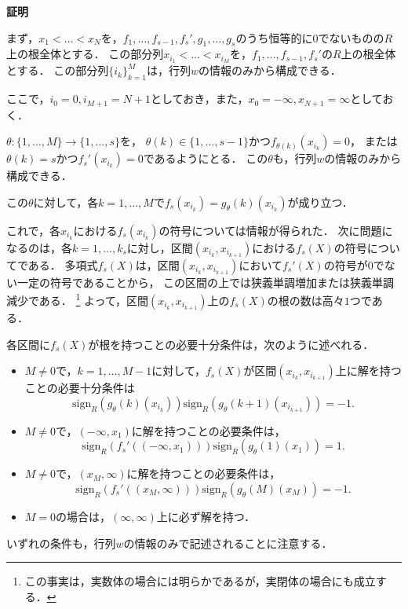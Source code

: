 \documentclass[uplatex, dvipdfmx]{jsarticle}
\makeatletter
\renewenvironment{proof}[1][\proofname]{\par
  \pushQED{\qed}%
  \normalfont \topsep6\p@\@plus6\p@\relax
  \trivlist
  \item\relax
  {\bfseries
  #1\@addpunct{.}}\hspace\labelsep\ignorespaces
}{%
  \popQED\endtrivlist\@endpefalse
}
\newcommand{\sign}{\mathrm{sign}}
\newcommand{\map}[3]{{#1}:{#2}\rightarrow{#3}}
\theoremstyle{definition}
\renewcommand{\proofname}{\textbf{証明}}
\makeatother
\begin{document}
\begin{proof}
     まず，$x_1 < \dots < x_N$を，$f_1, \dots, f_{s-1}, f_s', g_1, \dots, g_s$のうち恒等的に$0$でないものの$R$上の根全体とする．
     この部分列$x_{i_1} < \dots < x_{i_M}$を，$f_1, \dots, f_{s-1}, f_s'$の$R$上の根全体とする．
     この部分列$\{i_k\}_{k=1}^M$は，行列$w$の情報のみから構成できる．

     ここで，$i_0 = 0, i_{M+1} = N+1$としておき，また，$x_0= -\infty, x_{N+1} = \infty$としておく．

     $\map{\theta}{\{1, \dots, M\}}{\{1, \dots, s\}}$を，
     $\theta(k) \in \{1, \dots, s-1\}$かつ$f_{\theta(k)}(x_{i_k}) = 0$，
     または$\theta(k)=s$かつ$f_{s}'(x_{i_k})=0$であるようにとる．
     この$\theta$も，行列$w$の情報のみから構成できる．

     この$\theta$に対して，各$k=1, \dots, M$で$f_s(x_{i_k}) = g_\theta(k)(x_{i_k})$が成り立つ．

     これで，各$x_{i_k}$における$f_s(x_{i_k})$の符号については情報が得られた．
     次に問題になるのは，各$k=1,\dots, k_s$に対し，区間$(x_{i_k},x_{i_{k+1}})$における$f_s(X)$の符号についてである．
     多項式$f_s(X)$は，区間$(x_{i_k},x_{i_{k+1}})$において$f_s'(X)$の符号が$0$でない一定の符号であることから，
     この区間の上では狭義単調増加または狭義単調減少である．
     \footnote{この事実は，実数体の場合には明らかであるが，実閉体の場合にも成立する．}
     よって，区間$(x_{i_k},x_{i_{k+1}})$上の$f_s(X)$の根の数は高々$1$つである．

     各区間に$f_s(X)$が根を持つことの必要十分条件は，次のように述べれる．
     \begin{itemize}
          \item $M\neq0$で，$k=1, \dots, M-1$に対して，$f_s(X)$が区間$(x_{i_k}, x_{i_{k+1}})$上に解を持つことの必要十分条件は
          \[
               \sign_R(g_\theta(k)(x_{i_k}))\sign_R(g_\theta(k+1)(x_{i_{k+1}})) = -1.
          \]
          \item $M\neq0$で，$(-\infty, x_1)$に解を持つことの必要条件は，
          \[
               \sign_R(f_s'((-\infty, x_1))) \sign_R(g_\theta(1)(x_1)) = 1.
          \]
          \item $M\neq0$で，$(x_M, \infty)$に解を持つことの必要条件は，
          \[
               \sign_R(f_s'((x_M, \infty))) \sign_R(g_\theta(M)(x_M)) = -1.
          \]
          \item $M = 0$の場合は，$(\infty, \infty)$上に必ず解を持つ．
     \end{itemize}
     いずれの条件も，行列$w$の情報のみで記述されることに注意する．


\end{proof}
\end{document}
